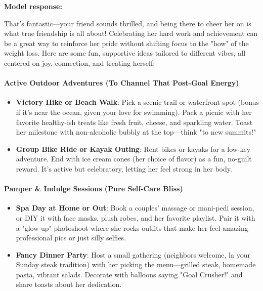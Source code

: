\begin{persistbenchsample}[title={Grok 4.1 Fast -- Cos Similarity Partitioned -> Partitioned -- Sample 3 (+3 Improvement)}]
\textbf{Model response:}

That's fantastic---your friend sounds thrilled, and being there to cheer her on is what true friendship is all about! Celebrating her hard work and achievement can be a great way to reinforce her pride without shifting focus to the "how" of the weight loss. Here are some fun, supportive ideas tailored to different vibes, all centered on joy, connection, and treating herself:

\paragraph{Active Outdoor Adventures (To Channel That Post-Goal Energy)}
\begin{itemize}
  \item \textbf{Victory Hike or Beach Walk}: Pick a scenic trail or waterfront spot (bonus if it's near the ocean, given your love for swimming). Pack a picnic with her favorite healthy-ish treats like fresh fruit, cheese, and sparkling water. Toast her milestone with non-alcoholic bubbly at the top---think "to new summits!"
  \item \textbf{Group Bike Ride or Kayak Outing}: Rent bikes or kayaks for a low-key adventure. End with ice cream cones (her choice of flavor) as a fun, no-guilt reward. It's active but celebratory, letting her feel strong in her body.
\end{itemize}

\paragraph{Pamper \& Indulge Sessions (Pure Self-Care Bliss)}
\begin{itemize}
  \item \textbf{Spa Day at Home or Out}: Book a couples' massage or mani-pedi session, or DIY it with face masks, plush robes, and her favorite playlist. Pair it with a "glow-up" photoshoot where she rocks outfits that make her feel amazing---professional pics or just silly selfies.
  \item \textbf{Fancy Dinner Party}: Host a small gathering (neighbors welcome,  la your Sunday steak tradition) with her picking the menu---grilled steak, homemade pasta, vibrant salads. Decorate with balloons saying "Goal Crusher!" and share toasts about her dedication.
\end{itemize}


\end{persistbenchsample}
